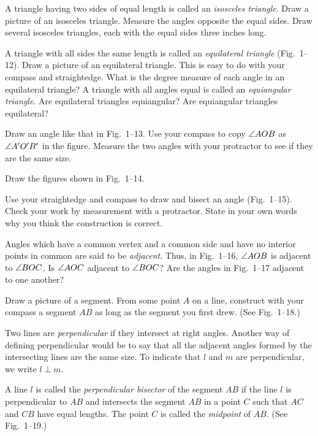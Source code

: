 \documentclass[11pt]{book}
\begin{document}
\begin{exercisecols}
\begin{exlist}
\item A triangle having two sides of equal length is called an \emph{isosceles
      triangle}. Draw a picture of an isosceles triangle. Measure the angles
      opposite the equal sides. Draw several isosceles triangles, each with the
      equal sides three inches long.
\item A triangle with all sides the same length is called an \emph{equilateral
      triangle} (Fig.~1--12). Draw a picture of an equilateral triangle. This is
      easy to do with your compass and straightedge. What is the degree measure of
      each angle in an equilateral triangle? A triangle with all angles equal is
      called an \emph{equiangular triangle}. Are equilateral triangles
      equiangular? Are equiangular triangles equilateral?
\exfig{\FIGITWELVE}
\item Draw an angle like that in Fig.~1--13. Use your compass to copy $\angle AOB$
      as $\angle A'O'B'$ in the figure. Measure the two angles with your protractor
      to see if they are the same size.
\exfig{\FIGITHIRTEEN}
\item Draw the figures shown in Fig.~1--14.
\exfig{\FIGIFOURTEEN}
\item Use your straightedge and compass to draw and bisect an angle
      (Fig.~1--15). Check your work by measurement with a protractor. State in
      your own words why you think the construction is correct.
\exfig{\FIGIFIFTEEN}
\item Angles which have a common vertex and a common side and have no interior
      points in common are said to be \emph{adjacent}. Thus, in Fig.~1--16,
      $\angle AOB$ is adjacent to $\angle BOC$. Is $\angle AOC$ adjacent to
      $\angle BOC$? Are the angles in Fig.~1--17 adjacent to one another?
\exfig{\FIGISIXTEEN}
\exfig{\FIGISEVENTEEN}
\item Draw a picture of a segment. From some point $A$ on a line, construct with
      your compass a segment $AB$ as long as the segment you first drew. (See
      Fig.~1--18.)
\exfig{\FIGIEIGHTEEN}
\item Two lines are \emph{perpendicular} if they intersect at right angles.
      Another way of defining perpendicular would be to say that all the adjacent
      angles formed by the intersecting lines are the same size. To indicate that
      $l$ and $m$ are perpendicular, we write $l \perp m$.

      A line $l$ is called the \emph{perpendicular bisector} of the segment $AB$
      if the line $l$ is perpendicular to $AB$ and intersects the segment $AB$ in
      a point $C$ such that $AC$ and $CB$ have equal lengths. The point $C$ is
      called the \emph{midpoint} of $AB$. (See Fig.~1--19.)


\end{exlist}
\end{exercisecols}
\end{document}
